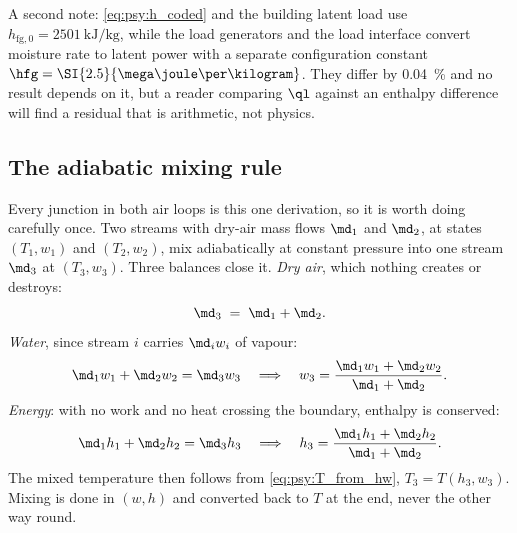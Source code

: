 A second note: \eqref{eq:psy:h_coded} and the building latent load use $h_{\mathrm{fg},0} =
\SI{2501}{\kilo\joule\per\kilogram}$, while the load generators and the load interface convert
moisture rate to latent power with a separate configuration constant $\hfg =
\SI{2.5}{\mega\joule\per\kilogram}$. They differ by \SI{0.04}{\percent} and no result depends on it,
but a reader comparing $\ql$ against an enthalpy difference will find a residual that is arithmetic,
not physics.

\subsection{The adiabatic mixing rule}
\label{sec:psy:mixing}

Every junction in both air loops is this one derivation, so it is worth doing carefully once. Two
streams with dry-air mass flows $\md_1$ and $\md_2$, at states $(T_1,w_1)$ and $(T_2,w_2)$, mix
adiabatically at constant pressure into one stream $\md_3$ at $(T_3,w_3)$. Three balances close it.
\emph{Dry air}, which nothing creates or destroys:
\begin{equation}
\md_3 \;=\; \md_1 + \md_2 . \label{eq:psy:mix_air}
\end{equation}
\emph{Water}, since stream $i$ carries $\md_i w_i$ of vapour:
\begin{equation}
\md_1 w_1 + \md_2 w_2 = \md_3 w_3 \quad\Longrightarrow\quad
w_3 = \frac{\md_1 w_1 + \md_2 w_2}{\md_1 + \md_2} . \label{eq:psy:mix_w}
\end{equation}
\emph{Energy}: with no work and no heat crossing the boundary, enthalpy is conserved:
\begin{equation}
\md_1 h_1 + \md_2 h_2 = \md_3 h_3 \quad\Longrightarrow\quad
h_3 = \frac{\md_1 h_1 + \md_2 h_2}{\md_1 + \md_2} . \label{eq:psy:mix_h}
\end{equation}
The mixed temperature then follows from \eqref{eq:psy:T_from_hw}, $T_3 = T(h_3,w_3)$. Mixing is done
in $(w,h)$ and converted back to $T$ at the end, never the other way round.

